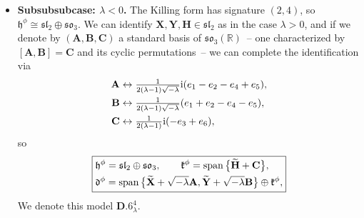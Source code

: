 \documentclass[pdftex]{sigma}
\newlength{\caseIndent}
\newcommand{\wt} [1]{\smash{\widetilde{#1}}}
\newcommand{\bbR}{\mathbb{R}}
\newcommand{\mbA}{\mathbf{A}}
\newcommand{\mbB}{\mathbf{B}}
\newcommand{\mbC}{\mathbf{C}}
\newcommand{\mbH}{\mathbf{H}}
\newcommand{\mbX}{\mathbf{X}}
\newcommand{\mbY}{\mathbf{Y}}
\newcommand{\mfd} {\mathfrak{d}}
\newcommand{\mfh} {\mathfrak{h}}
\newcommand{\mfk} {\mathfrak{k}}
\newcommand{\mfsl} {\mathfrak{sl}}
\newcommand{\mfso} {\mathfrak{so}}
\numberwithin{equation}{section}
\begin{document}
\begin{itemize}[leftmargin=\caseIndent]
\begin{itemize}[leftmargin=\caseIndent]
\begin{itemize}[leftmargin=\caseIndent]
		\item[] \textbf{Subsubsubcase: $\lambda < 0$.} The Killing form has signature $(2, 4)$, so $\mfh^{\phi} \cong \mfsl_2 \oplus \mfso_3$. We can identify $\mbX, \mbY, \mbH \in \mfsl_2$ as in the case $\lambda > 0$, and if we denote by $(\mbA, \mbB, \mbC)$ a standard basis of $\mfso_3(\bbR)$~-- one characterized by $[\mbA, \mbB] = \mbC$ and its cyclic permutations~-- we can complete the identification via
		\begin{align*}
			\mbA &\leftrightarrow \tfrac{1}{2 (\lambda - 1) \sqrt{-\lambda}} {\rm i} (e_1 - e_2 - e_4 + e_5) , \\
			\mbB &\leftrightarrow \tfrac{1}{2 (\lambda - 1) \sqrt{-\lambda}} (e_1 + e_2 - e_4 - e_5) , \\
			\mbC &\leftrightarrow \tfrac{1}{2 (\lambda - 1)} {\rm i} (-e_3 + e_6) ,
		\end{align*}
		so
			\begin{equation*}
				\boxed{
 \begin{split}
 & \mfh^{\phi} = \mfsl_2 \oplus \mfso_3 , \qquad
	 	 \mfk^{\phi} = \operatorname{span}\big\{\wt\mbH + \mbC\big\} , \\
& \mfd^{\phi} = \operatorname{span}\big\{
								\wt\mbX + \sqrt{-\lambda} \mbA ,
								\wt\mbY + \sqrt{-\lambda} \mbB
							 \big\} \oplus \mfk^{\phi} ,
 \end{split}
				}
			\end{equation*}
		We denote this model $\mathbf{D.6}_{\lambda}^4$.
		\end{itemize}


\end{itemize}
\end{itemize}
\end{document}
